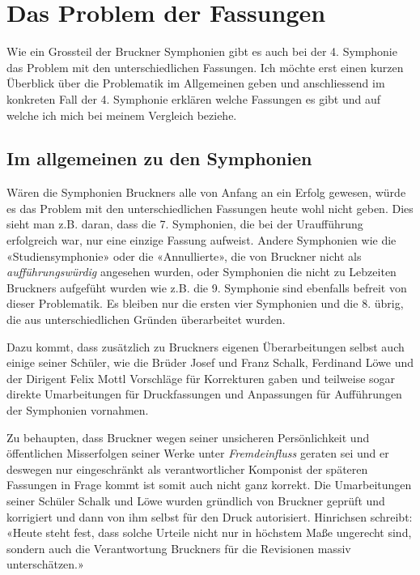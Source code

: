 \section{Das Problem der Fassungen}

Wie ein Grossteil der Bruckner Symphonien gibt es auch bei der 4. Symphonie das Problem mit den unterschiedlichen Fassungen.
Ich möchte erst einen kurzen Überblick über die Problematik im Allgemeinen geben und anschliessend im konkreten Fall der 4. Symphonie erklären welche Fassungen es gibt und auf welche ich mich bei meinem Vergleich beziehe.


\subsection{Im allgemeinen zu den Symphonien}

Wären die Symphonien Bruckners alle von Anfang an ein Erfolg gewesen, würde es das Problem mit den unterschiedlichen Fassungen heute wohl nicht geben.
Dies sieht man z.B. daran, dass die 7. Symphonien, die bei der Uraufführung erfolgreich war, nur eine einzige Fassung aufweist.
Andere Symphonien wie die «Studiensymphonie» oder die «Annullierte», die von Bruckner nicht als \emph{aufführungswürdig} angesehen wurden, oder Symphonien die nicht zu Lebzeiten Bruckners aufgefüht wurden wie z.B. die 9. Symphonie sind ebenfalls befreit von dieser Problematik.
Es bleiben nur die ersten vier Symphonien und die 8. übrig, die aus unterschiedlichen Gründen überarbeitet wurden.

Dazu kommt, dass zusätzlich zu Bruckners eigenen Überarbeitungen selbst auch einige seiner Schüler, wie die Brüder Josef und Franz Schalk, Ferdinand Löwe und der Dirigent Felix Mottl Vorschläge für Korrekturen gaben und teilweise sogar direkte Umarbeitungen für Druckfassungen und Anpassungen für Aufführungen der Symphonien vornahmen.

Zu behaupten, dass Bruckner wegen seiner unsicheren Persönlichkeit und öffentlichen Misserfolgen seiner Werke unter \emph{Fremdeinfluss} geraten sei und er deswegen nur eingeschränkt als verantwortlicher Komponist der späteren Fassungen in Frage kommt ist somit auch nicht ganz korrekt.
Die Umarbeitungen seiner Schüler Schalk und Löwe wurden gründlich von Bruckner geprüft und korrigiert und dann von ihm selbst für den Druck autorisiert.
Hinrichsen schreibt: «Heute steht fest, dass solche Urteile nicht nur in höchstem Maße ungerecht sind, sondern auch die Verantwortung Bruckners für die Revisionen massiv unterschätzen.»\autocite[33]{hinrichsen:bruckner}

